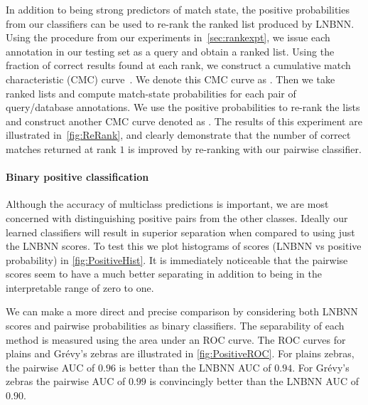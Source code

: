         \ConfusionMatch{}

        \EvalMetricsMatch{}

        In addition to being strong predictors of match state, the positive probabilities from our classifiers
          can be used to re-rank the ranked list produced by LNBNN.
        Using the procedure from our experiments in~\cref{sec:rankexpt}, we issue each annotation in our testing
          set as a query and obtain a ranked list.
        Using the fraction of correct results found at each rank, we construct a cumulative match characteristic
          (CMC) curve~\cite{decann_relating_2013}.
        We denote this CMC curve as .
        Then we take ranked lists and compute match-state probabilities for each pair of query/database
          annotations.
        We use the positive probabilities to re-rank the lists and construct another CMC curve denoted as
          .
        The results of this experiment are illustrated in~\cref{fig:ReRank}, and clearly demonstrate that the
          number of correct matches returned at rank $1$ is improved by re-ranking with our pairwise classifier.
        

        \ReRank{}
        
        \FloatBarrier{}
        \paragraph{Binary positive classification}
        Although the accuracy of multiclass predictions is important, we are most concerned with distinguishing
          positive pairs from the other classes.
        Ideally our learned classifiers will result in superior separation when compared to using just the LNBNN
          scores.
        To test this we plot histograms of scores (LNBNN vs positive probability) in \cref{fig:PositiveHist}.
        It is immediately noticeable that the pairwise scores seem to have a much better separating in addition
          to being in the interpretable range of zero to one.


        We can make a more direct and precise comparison by considering both LNBNN scores and pairwise
          probabilities as binary classifiers.
        The separability of each method is measured using the area under an ROC curve.
        The ROC curves for plains and Grévy's zebras are illustrated in \cref{fig:PositiveROC}.
        For plains zebras, the pairwise AUC of $0.96$ is better than the LNBNN AUC of $0.94$.
        For Grévy's zebras the pairwise AUC of $0.99$ is convincingly better than the LNBNN AUC of $0.90$.

